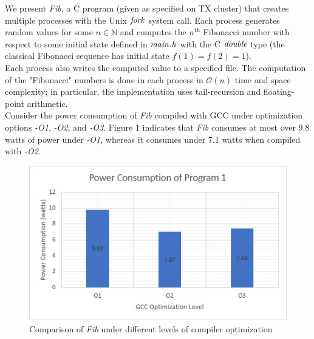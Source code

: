 \documentclass[12pt, twocolumn]{article}
\begin{document}
We present \textit{Fib}, a C program (given as specified on TX cluster) that creates multiple processes with the Unix $\it{fork}$ system call. Each process generates random values for some $n \in \mathbb{N}$ and computes the $n^{\text{th}}$ Fibonacci number with respect to some initial state defined in $\it{main.h}$ with the C $\it{double}$ type (the classical Fibonacci sequence has initial state $f(1) = f(2) = 1$). \\
\newline
Each process also writes the computed value to a specified file. The computation of the "Fibonacci" numbers is done in each process in $\mathcal{O}(n)$ time and space complexity; in particular, the implementation uses tail-recursion and floating-point arithmetic. \\
\newline
Consider the power consumption of \textit{Fib} compiled with GCC under optimization options \textit{-O1}, \textit{-O2}, and \textit{-O3}. Figure 1 indicates that \textit{Fib} consumes at most over 9.8 watts of power under \textit{-O1}, whereas it consumes under 7.1 watts when compiled with \textit{-O2}.
\begin{figure}[t]
  \centering
  
  \includegraphics[scale=0.65]{images/fig1.jpg}

  \caption{Comparison of \textit{Fib} under different levels of compiler optimization}
  \label{fig:1}
\end{figure}
\end{document}
